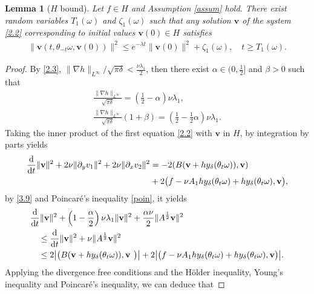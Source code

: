 \documentclass{elsarticle}
\newtheorem{lemma}[theorem]{Lemma}
\theoremstyle{definition}
\numberwithin{equation}{section}
\renewcommand{\d}{{\rm{d}}}
\begin{document}
\begin{lemma}[$H$ bound]\label{lemma4.1}
Let  $f\in H$ and Assumption \ref{assum} hold.
There exist random variables  $T_1(\omega)$ and $\zeta_1(\omega)$  such that any
  solution $\textbf{v}$  of the system \eqref{2.2} corresponding to initial  values  $\textbf{v}(0) \in H $ satisfies
  \begin{align}
 \|\textbf{v}(t,\theta_{-t} \omega, \textbf{v}(0))\|^2
 \leq e^{-\lambda t}\|\textbf{v}(0)\|^2
 + \zeta_1(\omega) ,\quad t\geq T_1(\omega).  \nonumber
\end{align}
\end{lemma}
\begin{proof}
By \eqref{2.3}, $  {\|\nabla h\|_{L^\infty} }/ \sqrt{\pi\delta} < \frac{\nu  \lambda_1}{2}$, then there exist  $  \alpha \in  (0,\frac{1}{2}]$ and $\beta>0$  such that
\begin{gather}
  \frac{\|\nabla h\|_{L^\infty} }{\sqrt {\pi\delta}}  =  (\frac{1}{2}- \alpha) \nu  \lambda_1,  \label{c1} \\
   \frac{  \|\nabla h\|_{L^\infty}  }{ \sqrt{\pi\delta}}  \left( 1 +  \beta \right )  =   (\frac{1}{2}-\frac  1 2 \alpha)\nu \lambda_1  .  \label{c2}
  \end{gather}
Taking the inner product of the first equation   \eqref{2.2} with $\textbf{v}$ in $H$, by integration by parts yields
\begin{align}
\frac{\d}{\d t}\|\textbf{v}\|^2+ 2\nu  \|\partial_yv_1\|^2+2\nu  \|\partial_xv_2\|^2
 &=-2(B(\textbf{v}+hy_\delta(\theta_t\omega)) ,\textbf{v})\nonumber\\
 &+ 2\big (f- \nu A_1hy_\delta(\theta_t\omega) +hy_\delta(\theta_t\omega),\textbf{v}\big),
\end{align}
by \eqref{3.9} and Poincar\'e's inequality \eqref{poin}, it yields
\begin{align}
 & \frac{\d}{\d t}\|\textbf{v}\|^2+ \left(1-\frac \alpha 2\right)  \nu  \lambda_1  \| \textbf{v}\|^2  + \frac {\alpha \nu } 2   \|A^{\frac12}\textbf{v}\|^2 \nonumber  \\
 &\quad \leq \frac{\d}{\d t}\|\textbf{v}\|^2  + \nu  \|A^{\frac12}\textbf{v}\|^2 \nonumber\\
&\quad  \leq 2 \big |\big(B(\textbf{v}+hy_\delta(\theta_t\omega)) ,\textbf{v }\big) \big|
+2\big| \big (f- \nu A_1hy_\delta(\theta_t\omega) +hy_\delta(\theta_t\omega),\textbf{v} \big)\big|  . \label{4.3}
\end{align}
Applying  the divergence free conditions and the H\"{o}lder inequality, Young's inequality and Poincar\'{e}'s inequality, we can deduce that

\end{proof}
\end{document}
